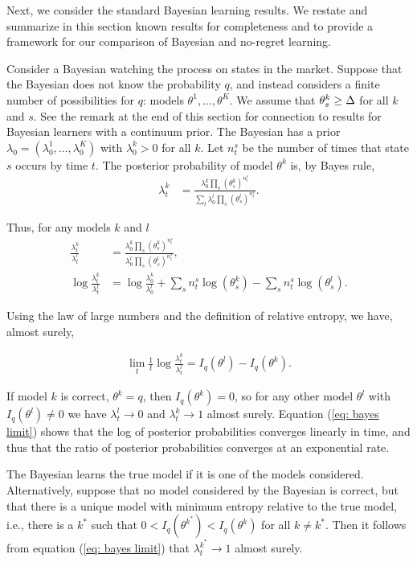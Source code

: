Next, we consider the standard Bayesian learning results. We restate and summarize in this section known results for completeness and to provide a framework for our comparison of Bayesian and no-regret learning.

Consider a Bayesian watching the process on states in the market. Suppose that the Bayesian does not know the probability $q$, and instead considers a finite number of possibilities for $q$: models $\theta^1, \dots, \theta^K$. We assume that $\theta^k_s \geq \Delta$ for all $k$ and $s$. See the remark at the end of this section for connection to results for Bayesian learners with a continuum prior. The Bayesian has a prior $\lambda_0=(\lambda^1_0, \dots, \lambda^K_0)$ with $\lambda^k_0 > 0$ for all $k$.
% 
Let $n_t^s$ be the number of times that state $s$ occurs by time $t$. The posterior probability of model $\theta^k$ is, by Bayes rule,
\begin{align}
\lambda^k_t &= \frac{\lambda^k_0\prod_s (\theta^k_s)^{n_t^s}}{\sum_l \lambda^l_0\prod_s (\theta^l_s)^{n_t^s}}.
\end{align}
\vspace{42pt}

Thus, for any models $k$ and $l$
\begin{align}
\frac{\lambda^k_t }{\lambda^l_t } &= \frac{\lambda^k_0\prod_s (\theta^k_s)^{n_t^s}}{\lambda^l_0\prod_s (\theta^l_s)^{n_t^s}},\\
\log\frac{\lambda^k_t }{\lambda^l_t } &= \log\frac{\lambda^k_0}{\lambda^l_0} + \sum_s n_t^s \log(\theta^k_s) - \sum_s n_t^s \log(\theta^l_s).
\end{align}

Using the law of large numbers and the definition of relative entropy, we have, almost surely, 

\begin{align}\label{eq: bayes limit}
\lim_t \frac{1}{t} \log\frac{\lambda^k_t }{\lambda^l_t } = I_q(\theta^l) - I_q(\theta^k).
\end{align}

If model $k$ is correct, $\theta^k = q$, then $I_q(\theta^k)=0$, so for any other model $\theta^l$ with $ I_q(\theta^l) \neq 0$ we have $\lambda^l_t \to 0$ and $\lambda^k_t \to 1$ almost surely. Equation (\ref{eq: bayes limit}) shows that the log of posterior probabilities converges linearly in time, and thus that the ratio of posterior probabilities converges at an exponential rate. 

The Bayesian learns the true model if it is one of the models considered. Alternatively, suppose that no model considered by the Bayesian is correct, but that there is a unique model with minimum entropy relative to the true model, i.e., there is a $k^*$ such that $0<I_q(\theta^{k^*})<I_q(\theta^k)$ for all $k\neq k^*$. Then it follows from equation (\ref{eq: bayes limit}) that $\lambda_t^{k^*} \to 1$ almost surely. 

